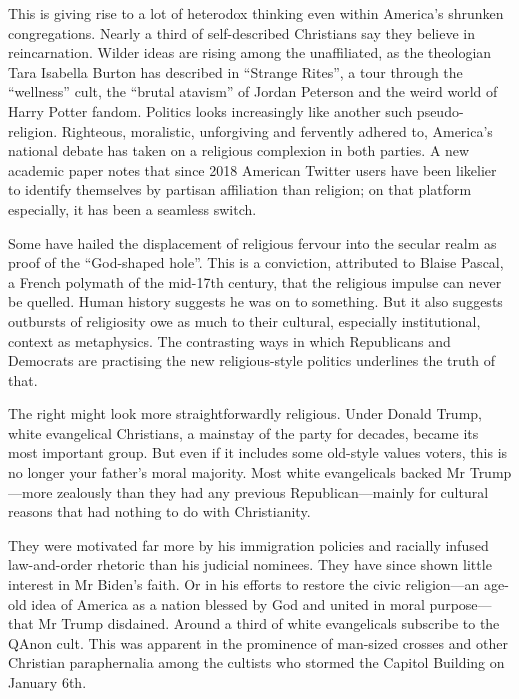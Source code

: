 \documentclass{article}
\begin{document}
This is giving rise to a lot of heterodox thinking even within America's shrunken congregations. Nearly a third of self-described Christians say they believe in reincarnation. Wilder ideas are rising among the unaffiliated, as the theologian Tara Isabella Burton has described in ``Strange Rites'', a tour through the ``wellness'' cult, the ``brutal atavism'' of Jordan Peterson and the weird world of Harry Potter fandom. Politics looks increasingly like another such pseudo-religion. Righteous, moralistic, unforgiving and fervently adhered to, America's national debate has taken on a religious complexion in both parties. A new academic paper notes that since 2018 American Twitter users have been likelier to identify themselves by partisan affiliation than religion; on that platform especially, it has been a seamless switch. 

Some have hailed the displacement of religious fervour into the secular realm as proof of the ``God-shaped hole''. This is a conviction, attributed to Blaise Pascal, a French polymath of the mid-17th century, that the religious impulse can never be quelled. Human history suggests he was on to something. But it also suggests outbursts of religiosity owe as much to their cultural, especially institutional, context as metaphysics. The contrasting ways in which Republicans and Democrats are practising the new religious-style politics underlines the truth of that. 

The right might look more straightforwardly religious. Under Donald Trump, white evangelical Christians, a mainstay of the party for decades, became its most important group. But even if it includes some old-style values voters, this is no longer your father's moral majority. Most white evangelicals backed Mr Trump---more zealously than they had any previous Republican---mainly for cultural reasons that had nothing to do with Christianity. 

They were motivated far more by his immigration policies and racially infused law-and-order rhetoric than his judicial nominees. They have since shown little interest in Mr Biden's faith. Or in his efforts to restore the civic religion---an age-old idea of America as a nation blessed by God and united in moral purpose---that Mr Trump disdained. Around a third of white evangelicals subscribe to the QAnon cult. This was apparent in the prominence of man-sized crosses and other Christian paraphernalia among the cultists who stormed the Capitol Building on January 6th. 
\end{document}

